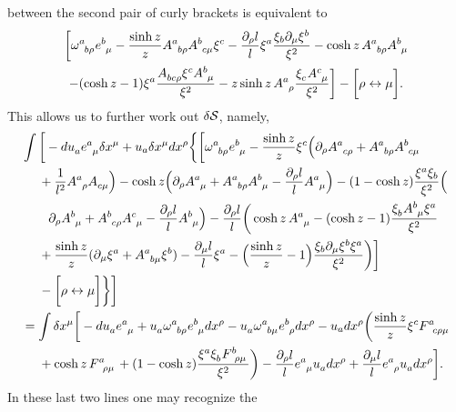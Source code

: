 \documentclass[
final,
11pt,
a4paper,
DIV=11,
headinclude=true,
footinclude=false,
bibliography=totoc,
twoside=true,  %
BCOR=5mm
]{scrbook}
\begin{document}
\begin{subappendices}
between the second pair of curly brackets is equivalent to
\begin{multline*}
  \bigg[ \omega\ind{^a_{b\rho}} e\ind{^b_\mu} - \frac{\sinh z}{z} 
  A\ind{^a_{b\rho}} A\ind{^b_{c\mu}} \xi^c - \frac{\pd_\rho l}{l} 
  \xi^a \frac{\xi_b \pd_\mu \xi^b}{\xi^2} - \cosh z\, 
  A\ind{^a_{b\rho}} A\ind{^b_\mu}
  \\
  - (\cosh z - 1) \xi^a \frac{A\ind{_{bc\rho}} \xi^c 
    A\ind{^b_\mu}}{\xi^2} - z \sinh z\, A\ind{^a_\rho} 
  \frac{\xi\ind{_c} A\ind{^c_\mu}}{\xi^2} \bigg] - \bigg[ \rho 
  \leftrightarrow \mu \bigg].
\end{multline*}
This allows us to further work out $\delta\mathcal{S}$, namely,
\begin{align*}
  &\int \bigg[ -du\ind{_a} e\ind{^a_\mu} \delta x^\mu + u_a 
  \delta x^\mu dx^\rho \bigg\{ \bigg[ \omega\ind{^a_{b\rho}} 
  e\ind{^b_\mu} - \frac{\sinh z}{z} \xi^c \Big( \pd_\rho 
  A\ind{^a_{c\rho}} + A\ind{^a_{b\rho}} A\ind{^b_{c\mu}}
  \\
  &\nla{} + \frac{1}{l^2} A\ind{^a_\rho} A\ind{_{c\mu}} \Big) 
  - \cosh z \Big( \pd_\rho A\ind{^a_\mu} + A\ind{^a_{b\rho}} 
  A\ind{^b_\mu} - \frac{\pd_\rho l}{l} A\ind{^a_\mu} \Big) - (1 
  - \cosh z) \frac{\xi^a \xi_b}{\xi^2} \Big( \\
  &\nla\hphantom{\mathrel{+}} \pd_\rho A\ind{^b_\mu} 
  + A\ind{^b_{c\rho}} A\ind{^c_\mu} - \frac{\pd_\rho l}{l} 
  A\ind{^b_\mu} \Big) - \frac{\pd_\rho l}{l} \bigg( \cosh z\, 
  A\ind{^a_\mu} - (\cosh z - 1) \frac{\xi\ind{_b} A\ind{^b_\mu} 
    \xi^a}{\xi^2} \\
  &\nla{} + \frac{\sinh z}{z}(\pd_\mu \xi^a 
  + A\ind{^a_{b\mu}} \xi^b)- \frac{\pd_\mu l}{l} \xi^a 
  - \Big( \frac{\sinh z}{z} - 1 \Big) \frac{\xi_b \pd_\mu \xi^b 
    \xi^a}{\xi^2} \bigg) \bigg] \\
  &\nla{} - \bigg[ \rho \leftrightarrow \mu \bigg] \bigg\} \bigg]
  \\
  &= \int \delta x^\mu \bigg[ -du\ind{_a} e\ind{^a_\mu} 
  + u\ind{_a} \omega\ind{^a_{b\rho}} e\ind{^b_\mu} dx^\rho 
  - u\ind{_a} \omega\ind{^a_{b\mu}} e\ind{^b_\rho} dx^\rho - u_a 
  dx^\rho \bigg( \frac{\sinh z}{z} \xi^c F\ind{^a_{c\rho\mu}}
  \\
  &\nla{} + \cosh z\, F\ind{^a_{\rho\mu}} + (1 - \cosh z) 
  \frac{\xi^a \xi\ind{_b} F\ind{^b_{\rho\mu}}}{\xi^2} \bigg) 
  - \frac{\pd_\rho l}{l} e\ind{^a_\mu} u\ind{_a} dx^\rho 
  + \frac{\pd_\mu l}{l} e\ind{^a_\rho} u\ind{_a} dx^\rho \bigg].
\end{align*}
In these last two lines one may recognize the 

\end{subappendices}
\end{document}

